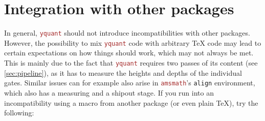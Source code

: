 \documentclass{scrartcl}
\makeatletter
\def\pkg#1{\textcolor{brown}{\texttt{#1}}}
\def\Yquant{\pkg{yquant}}
\newcommand*{\the@orig@section}{}
\let\the@orig@section=\section
\renewcommand*{\section}{%
   \clearpage%
   \the@orig@section%
}
\makeatother
\begin{document}
   \section{Integration with other packages}
      In general, \Yquant{} should not introduce incompatibilities with other packages.
      However, the possibility to mix \Yquant{} code with arbitrary \TeX{} code may lead to certain expectations on how things should work, which may not always be met.
      This is mainly due to the fact that \Yquant{} requires two passes of its content (see \cref{sec:pipeline}), as it has to measure the heights and depths of the individual gates.
      Similar issues can for example also arise in \pkg{amsmath}'s \texttt{align} environment, which also has a measuring and a shipout stage.
      If you run into an incompatibility using a macro from another package (or even plain \TeX), try the following:
\end{document}
